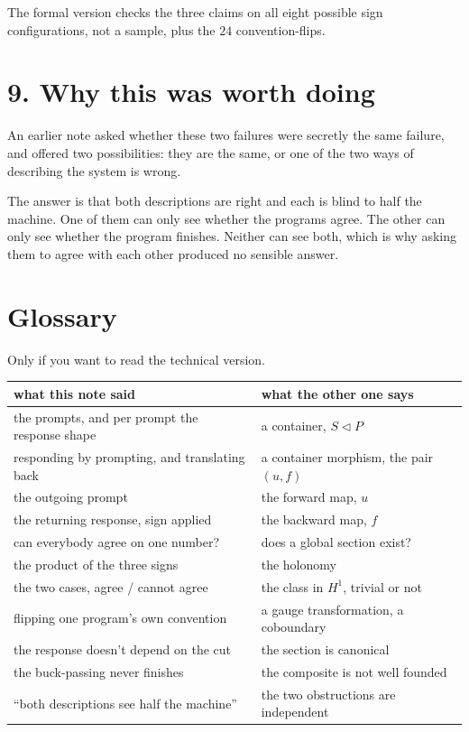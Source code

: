 \documentclass[11pt,a4paper]{article}
\begin{document}
The formal version checks the three claims on all eight possible sign
configurations, not a sample, plus the $24$ convention-flips.

\section*{9. Why this was worth doing}

An earlier note asked whether these two failures were secretly the same failure,
and offered two possibilities: they are the same, or one of the two ways of
describing the system is wrong.

The answer is that both descriptions are right and each is blind to half the
machine. One of them can only see whether the programs agree. The other can only
see whether the program finishes. Neither can see both, which is why asking them
to agree with each other produced no sensible answer.

\section*{Glossary}

Only if you want to read the technical version.

\begin{center}
\small
\begin{tabular}{ll}
\toprule
what this note said & what the other one says \\
\midrule
the prompts, and per prompt the response shape & a container, $S \triangleleft P$ \\
responding by prompting, and translating back & a container morphism, the pair $(u,f)$ \\
the outgoing prompt & the forward map, $u$ \\
the returning response, sign applied & the backward map, $f$ \\
can everybody agree on one number? & does a global section exist? \\
the product of the three signs & the holonomy \\
the two cases, agree / cannot agree & the class in $H^1$, trivial or not \\
flipping one program's own convention & a gauge transformation, a coboundary \\
the response doesn't depend on the cut & the section is canonical \\
the buck-passing never finishes & the composite is not well founded \\
``both descriptions see half the machine'' & the two obstructions are independent \\
\bottomrule
\end{tabular}
\end{center}
\end{document}
